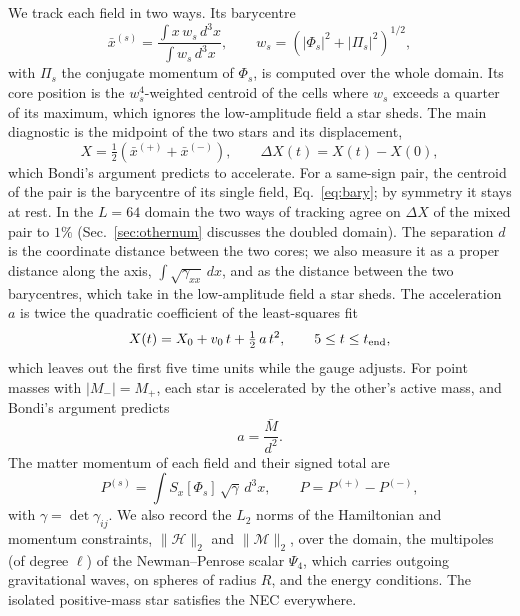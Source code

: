 \documentclass[twocolumn,floatfix,aps,prd,superscriptaddress,nofootinbib]{revtex4-2}
\begin{document}
We track each field in two ways. Its barycentre
\begin{equation}
\bar x^{(s)}=\frac{\int x\,w_s\,d^3x}{\int w_s\,d^3x},\qquad w_s=\left(|\Phi_s|^2+|\Pi_s|^2\right)^{1/2},
\label{eq:bary}
\end{equation}
with $\Pi_s$ the conjugate momentum of $\Phi_s$, is computed over the whole domain. Its core position is the $w_s^4$-weighted centroid of the cells where $w_s$ exceeds a quarter of its maximum, which ignores the low-amplitude field a star sheds. The main diagnostic is the midpoint of the two stars and its displacement,
\begin{equation}
X=\tfrac12\left(\bar x^{(+)}+\bar x^{(-)}\right),\qquad \Delta X(t)=X(t)-X(0),
\label{eq:mid}
\end{equation}
which Bondi's argument predicts to accelerate. For a same-sign pair, the centroid of the pair is the barycentre of its single field, Eq.~\eqref{eq:bary}; by symmetry it stays at rest. In the $L=64$ domain the two ways of tracking agree on $\Delta X$ of the mixed pair to $1\%$ (Sec.~\ref{sec:othernum} discusses the doubled domain). The separation $d$ is the coordinate distance between the two cores; we also measure it as a proper distance along the axis, $\int\sqrt{\gamma_{xx}}\,dx$, and as the distance between the two barycentres, which take in the low-amplitude field a star sheds. The acceleration $a$ is twice the quadratic coefficient of the least-squares fit
\begin{equation}
X(t)=X_0+v_0\,t+\tfrac12\,a\,t^2,\qquad 5\le t\le t_{\rm end},
\label{eq:fit}
\end{equation}
which leaves out the first five time units while the gauge adjusts. For point masses with $|M_-|=M_+$, each star is accelerated by the other's active mass, and Bondi's argument predicts
\begin{equation}
a=\frac{\bar M}{d^2}.
\label{eq:bondilaw}
\end{equation}
The matter momentum of each field and their signed total are
\begin{equation}
P^{(s)}=\int S_x[\Phi_s]\,\sqrt{\gamma}\,d^3x,\qquad P=P^{(+)}-P^{(-)},
\label{eq:momentum}
\end{equation}
with $\gamma=\det\gamma_{ij}$. We also record the $L_2$ norms of the Hamiltonian and momentum constraints, $\|\mathcal{H}\|_2$ and $\|\mathcal{M}\|_2$, over the domain, the multipoles (of degree $\ell$) of the Newman--Penrose scalar $\Psi_4$, which carries outgoing gravitational waves, on spheres of radius $R$, and the energy conditions. The isolated positive-mass star satisfies the NEC everywhere.
\end{document}
